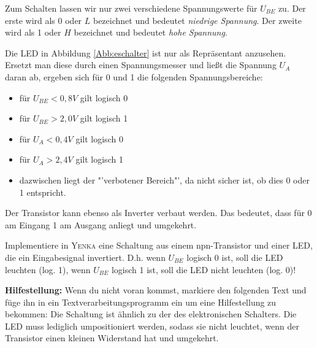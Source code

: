Zum Schalten lassen wir nur zwei verschiedene Spannungswerte für $U_{BE}$ zu.
Der erste wird als 0 oder $L$ bezeichnet und bedeutet \emph{niedrige Spannung}. Der zweite wird als 1 oder $H$ bezeichnet und bedeutet \emph{hohe Spannung}.

Die LED in Abbildung \ref{Abb:eschalter} ist nur als Repräsentant anzusehen. Ersetzt man diese durch einen Spannungsmesser und ließt die Spannung $U_A$ daran ab, ergeben sich für 0 und 1 die folgenden Spannungsbereiche:

\begin{sich}
\hfill \par
\vspace*{-.7cm}
\begin{itemize}
\item für $U_{BE} < 0,8V$ gilt logisch 0
\item für $U_{BE} > 2,0V$ gilt logisch 1
\item für $U_{A} < 0,4V$ gilt logisch 0
\item für $U_{A} > 2,4V$ gilt logisch 1
\item dazwischen liegt der "'verbotener Bereich"', da nicht sicher ist, ob dies 0 oder 1 entspricht.
\end{itemize}
\end{sich}



Der Transistor kann ebenso als Inverter verbaut werden. Das bedeutet, dass für 0 am Eingang 1 am Ausgang anliegt und umgekehrt.


\begin{Aufgabe} \label{Aufg:Inverter}
Implementiere in \textsc{Yenka} eine Schaltung aus einem npn-Transistor und einer LED, die ein Eingabesignal invertiert.
D.h. wenn $U_{BE}$ logisch 0 ist, soll die LED leuchten (log. 1), wenn $U_{BE}$ logisch 1 ist, soll die LED nicht leuchten (log. 0)!


\textbf{Hilfestellung:} Wenn du nicht voran kommst, markiere den folgenden Text und füge ihn in ein Textverarbeitungsprogramm ein um eine Hilfestellung zu bekommen: 
\textcolor{grau}{Die Schaltung ist ähnlich zu der des elektronischen Schalters. Die LED muss lediglich umpositioniert werden, sodass sie nicht leuchtet, wenn der Transistor einen kleinen Widerstand hat und umgekehrt.}
\end{Aufgabe}

